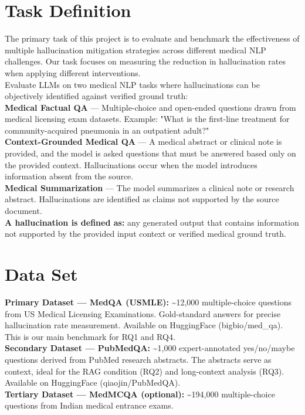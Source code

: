 \documentclass[11pt]{article}
\begin{document}
\section{Task Definition}
The primary task of this project is to evaluate and benchmark the effectiveness of multiple hallucination mitigation strategies across different medical NLP challenges. Our task focuses on measuring the reduction in hallucination rates when applying different interventions.\\
Evaluate LLMs on two medical NLP tasks where hallucinations can be objectively identified against verified ground truth:
\\
\textbf{Medical Factual QA} — Multiple-choice and open-ended questions drawn from medical licensing exam datasets. Example: "What is the first-line treatment for community-acquired pneumonia in an outpatient adult?"
\\
\textbf{Context-Grounded Medical QA} — A medical abstract or clinical note is provided, and the model is asked questions that must be answered based only on the provided context. Hallucinations occur when the model introduces information absent from the source.
\\
\textbf{Medical Summarization} — The model summarizes a clinical note or research abstract. Hallucinations are identified as claims not supported by the source document.
\\
\textbf{A hallucination is defined as:} any generated output that contains information not supported by the provided input context or verified medical ground truth.

\section{Data Set}
\textbf{Primary Dataset --- MedQA (USMLE):} \textasciitilde 12,000 multiple-choice questions from US Medical Licensing Examinations. Gold-standard answers for precise hallucination rate measurement. Available on HuggingFace (bigbio/med\_qa). This is our main benchmark for RQ1 and RQ4.\\
\textbf{Secondary Dataset — PubMedQA:} \textasciitilde 1,000 expert-annotated yes/no/maybe questions derived from PubMed research abstracts. The abstracts serve as context, ideal for the RAG condition (RQ2) and long-context analysis (RQ3). Available on HuggingFace (qiaojin/PubMedQA).\\
\textbf{Tertiary Dataset — MedMCQA (optional):} \textasciitilde 194,000 multiple-choice questions from Indian medical entrance exams. \\
\end{document}
